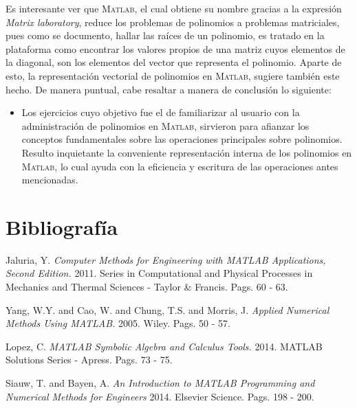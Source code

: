 \documentclass[11pt, spanish]{article}
\begin{document}
Es interesante ver que \textsc{Matlab}, el cual obtiene su nombre gracias a la expresión \textit{Matrix laboratory}, reduce los problemas de polinomios a problemas matriciales, pues como se documento, hallar las raíces de un polinomio, es tratado en la plataforma como encontrar los valores propios de una matriz cuyos elementos de la diagonal, son los elementos del vector que representa el polinomio. Aparte de esto, la representación vectorial de polinomios en \textsc{Matlab}, sugiere también este hecho. De manera puntual, cabe resaltar a manera de conclusión lo siguiente:

\begin{itemize}

\item Los ejercicios cuyo objetivo fue el de familiarizar al usuario con la administración de polinomios en \textsc{Matlab}, sirvieron para afianzar los conceptos fundamentales sobre las operaciones principales sobre polinomios. Resulto inquietante la conveniente representación interna de los polinomios en \textsc{Matlab}, lo cual ayuda con la eficiencia y escritura de las operaciones antes mencionadas.
   
\end{itemize}



\section{Bibliografía}

\begingroup
\renewcommand{\section}[2]{}%
\begin{thebibliography}{}


 Jaluria, Y. {\em Computer Methods for Engineering with MATLAB Applications, Second Edition.} 2011. Series in Computational and Physical Processes in Mechanics and Thermal Sciences - Taylor \& Francis. Pags. 60 - 63.

 Yang, W.Y. and Cao, W. and Chung, T.S. and Morris, J. {\em Applied Numerical Methods Using MATLAB.} 2005. Wiley. Pags. 50 - 57.

 Lopez, C. {\em MATLAB Symbolic Algebra and Calculus Tools.} 2014. MATLAB Solutions Series - Apress. Pags. 73 - 75.

 Siauw, T. and Bayen, A. {\em An Introduction to MATLAB Programming and Numerical Methods for Engineers} 2014. Elsevier Science. Pags. 198 - 200.

\end{thebibliography}
\endgroup


\end{document}
